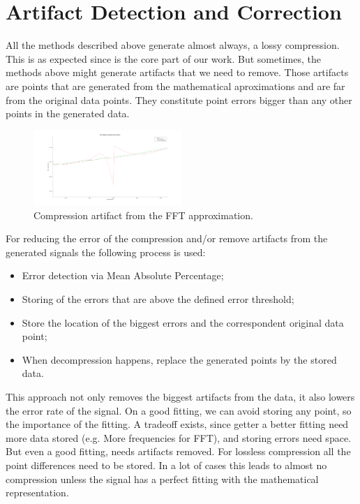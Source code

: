 \documentclass[conference]{IEEEtran}
\begin{document}
\vspace{10pt}
\section{Artifact Detection and Correction}

All the methods described above generate almost always, a lossy compression. 
This is as expected since is the core part of our work. 
But sometimes, the methods above might generate artifacts that we need to remove. 
Those artifacts are points that are generated from the mathematical aproximations and are far from the original data points.
They constitute point errors bigger than any other points in the generated data.

\begin{figure}[ht]
  \centering
  \includegraphics[width=0.5\textwidth]{compression_artifact.png}
  \caption{Compression artifact from the FFT approximation.}
  \label{Fig.4}
\end{figure}
\vspace{5pt}

For reducing the error of the compression and/or remove artifacts from the generated signals the following process is used:

\begin{itemize}
    \item Error detection via Mean Absolute Percentage;
    \item Storing of the errors that are above the defined error threshold;
    \item Store the location of the biggest errors and the correspondent original data point;
    \item When decompression happens, replace the generated points by the stored data.
\end{itemize}

This approach not only removes the biggest artifacts from the data, it also lowers the error rate of the signal. On a good fitting, we can avoid storing any point, so the importance of the fitting.
A tradeoff exists, since getter a better fitting need more data stored (e.g. More frequencies for FFT), and storing errors need space. But even a good fitting, needs artifacts removed.
For lossless compression all the point differences need to be stored.
In a lot of cases this leads to almost no compression unless the signal has a perfect fitting with the mathematical representation.
\end{document}
